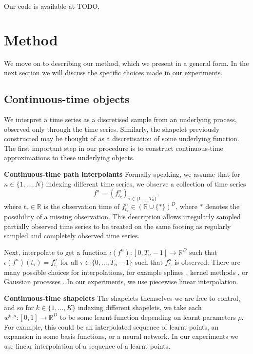 \documentclass{article}
\theoremstyle{plain}
\theoremstyle{definition}
\newcommand{\reals}{\mathbb{R}}
\newcommand{\boldheading}[1]{

\textbf{#1}\quad}
\begin{document}
	Our code is available at TODO.
	
	\section{Method}
	We move on to describing our method, which we present in a general form. In the next section we will discuss the specific choices made in our experiments.
	
	\subsection{Continuous-time objects}
	We interpret a time series as a discretised sample from an underlying process, observed only through the time series. Similarly, the shapelet previously constructed may be thought of as a discretisation of some underlying function. The first important step in our procedure is to construct continuous-time approximations to these underlying objects.
	
	\boldheading{Continuous-time path interpolants}
	Formally speaking, we assume that for $n \in \{1, \ldots, N\}$ indexing different time series, we observe a collection of time series
	\begin{equation*}
	f^n = (f^n_{t_\tau})_{\tau \in \{1, \ldots, T_n\}},
	\end{equation*}
	where $t_\tau \in \reals$ is the observation time of $f^n_{t_\tau} \in (\reals \cup \{*\})^D$, where $*$ denotes the possibility of a missing observation. This description allows irregularly sampled partially observed time series to be treated on the same footing as regularly sampled and completely observed time series.
	
	Next, interpolate to get a function $\iota(f^n) \colon [0, T_n - 1] \to \reals^D$ such that $\iota(f^n)(t_\tau) = f^n_{t_\tau}$ for all $\tau \in \{0, \ldots, T_n - 1\}$ such that $f^n_{t_\tau}$ is observed. There are many possible choices for interpolations, for example splines \cite{TODO}, kernel methods \cite{interpolation-prediction}, or Gaussian processes \cite{gp-adapter1, gp-adapter2}. In our experiments, we use piecewise linear interpolation.
	
	\boldheading{Continuous-time shapelets}
	The shapelets themselves we are free to control, and so for $k \in \{1, \ldots, K\}$ indexing different shapelets, we take each $w^{k, \rho} \colon [0, 1] \to \reals^D$ to be some learnt function depending on learnt parameters $\rho$. For example, this could be an interpolated sequence of learnt points, an expansion in some basis functions, or a neural network. In our experiments we use linear interpolation of a sequence of a learnt points.
	
\end{document}
